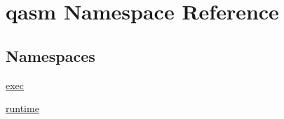 \hypertarget{namespaceqasm}{}\section{qasm Namespace Reference}
\label{namespaceqasm}
\subsection*{Namespaces}
\begin{DoxyCompactItemize}
\item 
 \hyperlink{namespaceqasm_1_1exec}{exec}
\item 
 \hyperlink{namespaceqasm_1_1runtime}{runtime}
\end{DoxyCompactItemize}
